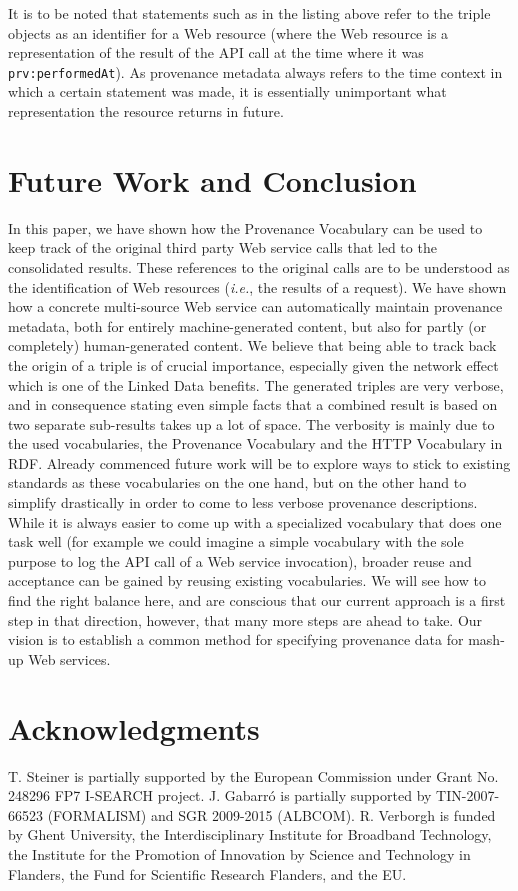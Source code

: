 \documentclass[twocolumn]{article}
\begin{document}
It is to be noted that statements such as in the listing above refer to the triple objects as an identifier for a Web resource (where the Web resource is a representation of the result of the API call at the time where it was \texttt{prv:performedAt}). As provenance metadata always refers to the time context in which a certain statement was made, it is essentially unimportant what representation the resource returns in future.

\section{Future Work and Conclusion}                                                        
\label{sec:conclusion}
In this paper, we have shown how the Provenance
Vocabulary can be used to keep track of the original third party Web service calls that led to the consolidated
results. These references to the original calls are to be understood as the identification of Web resources (\emph{i.e.}, the
results of a request). We have shown how a concrete multi-source Web service can automatically maintain provenance
metadata, both for entirely machine-generated content, but also for partly (or completely) human-generated content. We
believe that being able to track back the origin of a triple is of crucial importance, especially given the network
effect which is one of the Linked Data benefits. The generated triples are very verbose, and in consequence stating even simple facts that a combined result is based on two separate sub-results takes up a lot of space. The verbosity is mainly due to the used vocabularies, the Provenance Vocabulary and the HTTP Vocabulary in RDF.
Already commenced future work will be to explore ways to stick to existing standards as these vocabularies on the one hand, but on the other hand to simplify drastically in order to come to less verbose provenance descriptions. While it is always easier to come up with a specialized vocabulary that does one task well (for example we could imagine a simple vocabulary with the sole purpose to log the API call of a Web service invocation), broader reuse and acceptance can be gained by reusing existing vocabularies. We will see how to find the right balance here, and are conscious that our current approach is a first step in that direction, however, that many more steps are ahead to take. Our vision is to establish a common method for specifying provenance data for mash-up Web services. 

\section*{Acknowledgments}
T. Steiner is partially supported by the European Commission under Grant No. 248296 FP7 I-SEARCH project. J. Gabarr\'o is partially supported by TIN-2007-66523 (FORMALISM) and SGR 2009-2015 (ALBCOM). 
R. Verborgh is funded by Ghent University, the Interdisciplinary Institute for Broadband Technology, the Institute for the Promotion of Innovation by Science and Technology in Flanders, the Fund for Scientific Research Flanders, and the EU.
\end{document}
